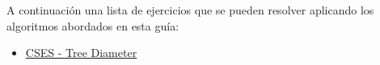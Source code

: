 A continuación una lista de ejercicios que se pueden resolver aplicando los algoritmos abordados en esta guía:

\begin{itemize}
	\item \href{https://cses.fi/problemset/task/1131}{CSES - Tree Diameter}
\end{itemize}